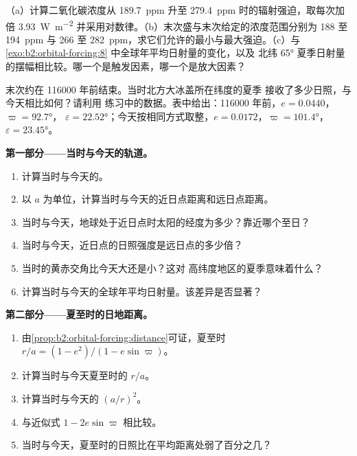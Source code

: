 \begin{exercise}[$\star\star\star$]\label{exo:b2:orbital-forcing:12}
（a）计算二氧化碳浓度从 \qty{189.7}{ppm} 升至
\qty{279.4}{ppm} 时的辐射强迫，取每次加倍 \qty{3.93}{W.m^{-2}} 并采用对数律。（b）末次盛与末次给定的浓度范围分别为
188 至 \qty{194}{ppm} 与 266 至
\qty{282}{ppm}，求它们允许的最小与最大强迫。（c）与
\cref{exo:b2:orbital-forcing:8} 中全球年平均日射量的变化，以及
北纬 \ang{65} 夏季日射量的摆幅相比较。哪一个是触发因素，哪一个是放大因素？
\end{exercise}

\begin{problem}\label{pb:b2:orbital-forcing:1}
末次约在 \num{116000} 年前结束。当时北方大冰盖所在纬度的夏季
接收了多少日照，与今天相比如何？请利用
练习中的数据。表中给出：\num{116000} 年前，$e = 0.0440$，$\varpi = \ang{92.7}$，
$\varepsilon = \ang{22.52}$；今天按相同方式取整，$e = 0.0172$，$\varpi = \ang{101.4}$，
$\varepsilon = \ang{23.45}$。

\medskip\noindent\textbf{第一部分——当时与今天的轨道。}
\begin{enumerate}
  \item 计算当时与今天的。
  \item 以 $a$ 为单位，计算当时与今天的近日点距离和远日点距离。
  \item 当时与今天，地球处于近日点时太阳的经度为多少？靠近哪个至日？
  \item 当时与今天，近日点的日照强度是远日点的多少倍？
  \item 当时的黄赤交角比今天大还是小？这对
        高纬度地区的夏季意味着什么？
  \item 计算当时与今天的全球年平均日射量。该差异是否显著？
\end{enumerate}

\medskip\noindent\textbf{第二部分——夏至时的日地距离。}
\begin{enumerate}[resume]
  \item 由\cref{prop:b2:orbital-forcing:distance}可证，夏至时 $r/a = (1 -
        e^2)/(1 - e\sin\varpi)$。
  \item 计算当时与今天夏至时的 $r/a$。
  \item 计算当时与今天的 $(a/r)^2$。
  \item 与近似式 $1 - 2e\sin\varpi$ 相比较。
  \item 当时与今天，夏至时的日照比在平均距离处弱了百分之几？
\end{enumerate}


\end{problem}
